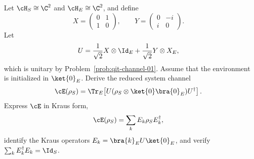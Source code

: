 Let $\cH_S\cong\C^2$ and $\cH_E\cong\C^2$, and define
$$
X=
\begin{pmatrix}
0&1\\
1&0
\end{pmatrix},
\qquad
Y=
\begin{pmatrix}
0&-i\\
i&0
\end{pmatrix}.
$$
Let
$$
U=
\frac{1}{\sqrt{2}}X\otimes\Id_E
+
\frac{1}{\sqrt{2}}Y\otimes X_E,
$$
which is unitary by Problem~\ref{prob:qit-channel-01}. Assume that the environment is initialized in $\ket{0}_E$. Derive the reduced system channel
$$
\cE(\rho_S)
=
\Tr_E\!\left[
U(\rho_S\otimes\ket{0}\bra{0}_E)U^\dagger
\right].
$$
Express $\cE$ in Kraus form,
$$
\cE(\rho_S)=\sum_k E_k\rho_S E_k^\dagger,
$$
identify the Kraus operators $E_k=\bra{k}_E U\ket{0}_E$, and verify $\sum_k E_k^\dagger E_k=\Id_S$.
